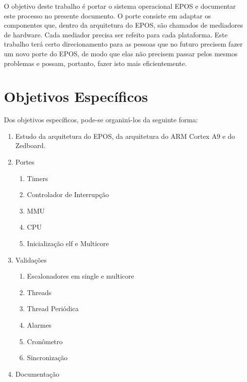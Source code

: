 O objetivo deste trabalho é portar o sistema operacional EPOS e documentar este processo no presente documento. O porte consiste em adaptar os componentes que, dentro da arquitetura do EPOS, são chamados de mediadores de hardware. Cada mediador precisa ser refeito para cada plataforma.
Este trabalho terá certo direcionamento para as pessoas que no futuro precisem fazer um novo porte do EPOS, de modo que elas não precisem passar pelos mesmos problemas e possam, portanto, fazer isto mais eficientemente.

\section{Objetivos Específicos}
Dos objetivos específicos, pode-se organizá-los da seguinte forma:

\begin{enumerate}
    \item Estudo da arquitetura do EPOS, da arquitetura do ARM Cortex A9 e do Zedboard.
    \item Portes
    \begin{enumerate}
        \item Timers
        \item Controlador de Interrupção
        \item MMU
        \item CPU
        \item Inicialização elf e Multicore
    \end{enumerate}
    \item Validações
    \begin{enumerate}
        \item Escalonadores em single e multicore
        \item Threads
        \item Thread Periódica
        \item Alarmes
        \item Cronômetro
        \item Sincronização
    \end{enumerate}
    \item Documentação
\end{enumerate}
